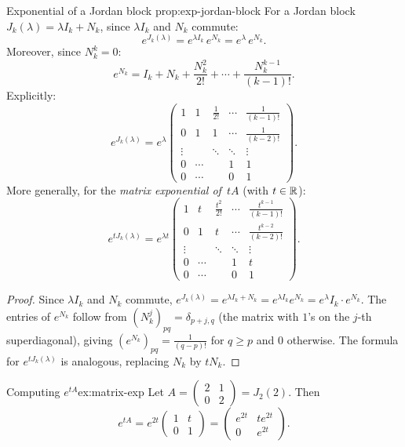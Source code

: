 \begin{proposition}{Exponential of a Jordan block}%
{prop:exp-jordan-block}
For a Jordan block $J_k(\lambda) = \lambda I_k + N_k$, since
$\lambda I_k$ and $N_k$ commute:
\[
  e^{J_k(\lambda)} = e^{\lambda I_k}\,e^{N_k}
  = e^{\lambda}\,e^{N_k}.
\]
Moreover, since $N_k^k = 0$:
\[
  e^{N_k} = I_k + N_k + \frac{N_k^2}{2!} + \cdots
    + \frac{N_k^{k-1}}{(k-1)!}.
\]
Explicitly:
\[
  e^{J_k(\lambda)} = e^{\lambda}
  \begin{pmatrix}
    1      & 1      & \frac{1}{2!}  & \cdots & \frac{1}{(k-1)!} \\
    0      & 1      & 1             & \cdots & \frac{1}{(k-2)!} \\
    \vdots &        & \ddots        & \ddots & \vdots            \\
    0      & \cdots &               & 1      & 1                 \\
    0      & \cdots &               & 0      & 1
  \end{pmatrix}.
\]
More generally, for the \emph{matrix exponential of~$tA$}
(with $t \in {\mathbb{R}}$):
\[
  e^{tJ_k(\lambda)} = e^{\lambda t}
  \begin{pmatrix}
    1      & t      & \frac{t^2}{2!}  & \cdots & \frac{t^{k-1}}{(k-1)!} \\
    0      & 1      & t               & \cdots & \frac{t^{k-2}}{(k-2)!} \\
    \vdots &        & \ddots          & \ddots & \vdots                  \\
    0      & \cdots &                 & 1      & t                       \\
    0      & \cdots &                 & 0      & 1
  \end{pmatrix}.
\]
\end{proposition}

\begin{proof}
Since $\lambda I_k$ and $N_k$ commute,
$e^{J_k(\lambda)} = e^{\lambda I_k + N_k} = e^{\lambda I_k} e^{N_k}
= e^\lambda I_k \cdot e^{N_k}$.  The entries of $e^{N_k}$ follow
from $(N_k^j)_{pq} = \delta_{p+j, q}$ (the matrix with $1$'s on the
$j$-th superdiagonal), giving
$(e^{N_k})_{pq} = \frac{1}{(q-p)!}$ for $q \geq p$ and $0$
otherwise.  The formula for $e^{tJ_k(\lambda)}$ is analogous, replacing
$N_k$ by $tN_k$.
\end{proof}

\begin{example}{Computing $e^{tA}$}{ex:matrix-exp}
Let $A = \begin{pmatrix} 2 & 1 \\ 0 & 2 \end{pmatrix} = J_2(2)$.
Then
\[
  e^{tA} = e^{2t}
  \begin{pmatrix} 1 & t \\ 0 & 1 \end{pmatrix}
  = \begin{pmatrix} e^{2t} & te^{2t} \\ 0 & e^{2t} \end{pmatrix}.
\]
\end{example}



